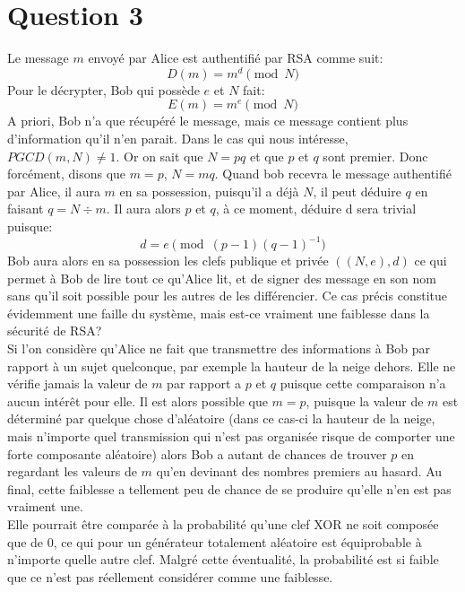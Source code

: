 \documentclass{article}
\begin{document}
\section{Question 3}
Le message $m$ envoyé par Alice est authentifié par RSA comme suit:
\begin{equation}
  D(m)=m^d \pmod{N}
\end{equation}
Pour le décrypter, Bob qui possède $e$ et $N$ fait:
\begin{equation}
  E(m)=m^e \pmod{N}
\end{equation}
A priori, Bob n'a que récupéré le message, mais ce message contient plus d'information qu'il n'en parait. Dans le cas qui nous intéresse, $PGCD(m, N) \neq 1$. Or on sait que $N = pq$ et que $p$ et $q$ sont premier. Donc forcément, disons que $m = p$, $N = mq$. Quand bob recevra le message authentifié par Alice, il aura $m$ en sa possession, puisqu'il a déjà $N$, il peut déduire $q$ en faisant $q = N \div m$. Il aura alors $p$ et $q$, à ce moment, déduire d sera trivial puisque:
\begin{equation}
  d = e\pmod{(p-1)(q-1)}^{-1}
\end{equation}
Bob aura alors en sa possession les clefs publique et privée $((N, e), d)$ ce qui permet à Bob de lire tout ce qu'Alice lit, et de signer des message en son nom sans qu'il soit possible pour les autres de les différencier. Ce cas précis constitue évidemment une faille du système, mais est-ce vraiment une faiblesse dans la sécurité de RSA?\\
Si l'on considère qu'Alice ne fait que transmettre des informations à Bob par rapport à un sujet quelconque, par exemple la hauteur de la neige dehors. Elle ne vérifie jamais la valeur de $m$ par rapport a $p$ et $q$ puisque cette comparaison n'a aucun intérêt pour elle. Il est alors possible que $m = p$, puisque la valeur de $m$ est déterminé par quelque chose d'aléatoire (dans ce cas-ci la hauteur de la neige, mais n'importe quel transmission qui n'est pas organisée risque de comporter une forte composante aléatoire) alors Bob a autant de chances de trouver $p$ en regardant les valeurs de $m$ qu'en devinant des nombres premiers au hasard. Au final, cette faiblesse a tellement peu de chance de se produire qu'elle n'en est pas vraiment une.\\
Elle pourrait être comparée à la probabilité qu'une clef XOR ne soit composée que de 0, ce qui pour un générateur totalement aléatoire est équiprobable à n'importe quelle autre clef. Malgré cette éventualité, la probabilité est si faible que ce n'est pas réellement considérer comme une faiblesse.
\end{document}
